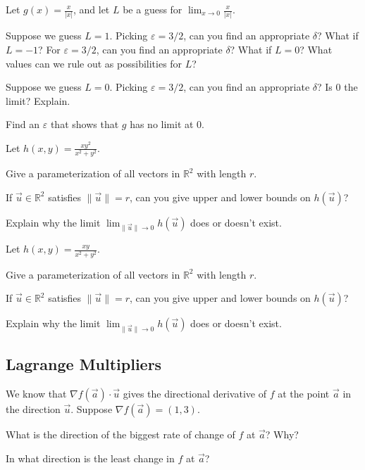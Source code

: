 \documentclass{problemset}
\newcommand{\R}{\mathbb{R}}
\begin{document}
	\question
	Let $g(x) = \frac{x}{|x|}$, and let $L$ be a guess for $\lim_{x\to 0} \frac{x}{|x|}$.
	\begin{parts}
		\item Suppose we guess $L=1$.  Picking $\varepsilon = 3/2$, can you find an appropriate
			$\delta$?  What if $L=-1$?  For $\varepsilon=3/2$, can you find an appropriate $\delta$?
			What if $L=0$?  What values can we rule out as possibilities for $L$?
		\item Suppose we guess $L=0$.  Picking $\varepsilon=3/2$, can you find an appropriate $\delta$?
			Is $0$ the limit?  Explain.
		\item Find an $\varepsilon$ that shows that $g$ has no limit at $0$.
	\end{parts}

	\question
	Let $h(x,y) = \frac{xy^2}{x^2+y^2}$.
	\begin{parts}
		\item Give a parameterization of all vectors in $\R^2$ with length $r$.
		\item If $\vec u\in \R^2$ satisfies $\|\vec u\|=r$, can you give upper
			and lower bounds on $h(\vec u)$?
		\item Explain why the limit $\displaystyle \lim_{\|\vec u\|\to 0} h(\vec u)$
			does or doesn't exist.
	\end{parts}
	\question
	Let $h(x,y) = \frac{xy}{x^2+y^2}$.
	\begin{parts}
		\item Give a parameterization of all vectors in $\R^2$ with length $r$.
		\item If $\vec u\in \R^2$ satisfies $\|\vec u\|=r$, can you give upper
			and lower bounds on $h(\vec u)$?
		\item Explain why the limit $\displaystyle \lim_{\|\vec u\|\to 0} h(\vec u)$
			does or doesn't exist.
	\end{parts}


\newpage
\subsection*{Lagrange Multipliers}

	\question
	We know that $\nabla f(\vec a)\cdot \vec u$ gives the directional derivative
	of $f$ at the point $\vec a$ in the direction $\vec u$.  Suppose
	$\nabla f(\vec a) = (1,3)$.
	\begin{parts}
		\item What is the direction of the biggest rate of change of $f$ at $\vec a$? Why?
		\item In what direction is the least change in $f$ at $\vec a$?
	\end{parts}
\end{document}
